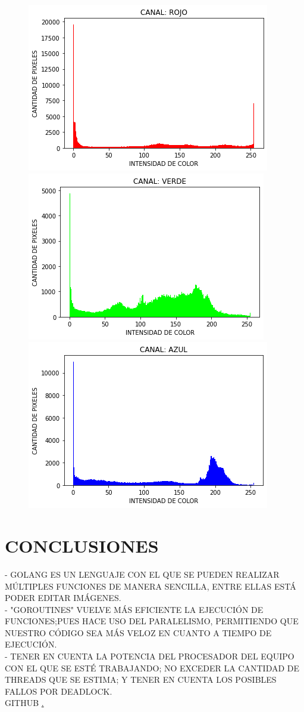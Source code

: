 \documentclass{article}
\begin{document}
\begin{figure}[h]
\centering
\includegraphics[scale=0.5]{red-gram.png}
\includegraphics[scale=0.5]{green-gram.png}
\includegraphics[scale=0.5]{blue-gram.png}
\end{figure}
\newpage
\section{CONCLUSIONES}
- GOLANG ES UN LENGUAJE CON EL QUE SE PUEDEN REALIZAR MÚLTIPLES FUNCIONES DE MANERA SENCILLA, ENTRE ELLAS ESTÁ PODER EDITAR IMÁGENES.
\\
- "GOROUTINES" VUELVE MÁS EFICIENTE LA EJECUCIÓN DE FUNCIONES;PUES HACE USO DEL PARALELISMO, PERMITIENDO QUE NUESTRO CÓDIGO SEA MÁS VELOZ EN CUANTO A TIEMPO DE EJECUCIÓN.
\\
- TENER EN CUENTA LA POTENCIA DEL PROCESADOR DEL EQUIPO CON EL QUE SE ESTÉ TRABAJANDO; NO EXCEDER LA CANTIDAD DE THREADS QUE SE ESTIMA; Y TENER EN CUENTA LOS POSIBLES FALLOS POR DEADLOCK.
\\
\newpage
\centering
GITHUB \href{https://github.com/ChristianRodriguez3012/FLP-IMAGENES_EN_GO}.
\end{document}
